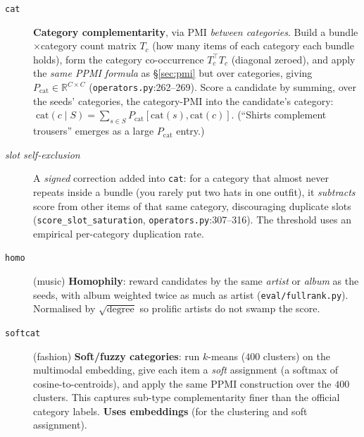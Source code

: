 \documentclass[11pt]{article}
\theoremstyle{remark}
\newcommand{\R}{\mathbb{R}}
\newcommand{\code}[1]{\texttt{\small #1}}
\begin{document}
\begin{description}
\item[\code{cat}] \textbf{Category complementarity}, via PMI \emph{between categories}. Build a bundle$\times$category
count matrix $T_c$ (how many items of each category each bundle holds), form the category co-occurrence
$T_c^{\!\top}T_c$ (diagonal zeroed), and apply the \emph{same PPMI formula} as \S\ref{sec:pmi} but over categories,
giving $P_{\text{cat}}\in\R^{C\times C}$ (\code{operators.py}:262--269). Score a candidate by summing, over the
seeds' categories, the category-PMI into the candidate's category:
$\;\mathrm{cat}(c\mid S)=\sum_{s\in S}P_{\text{cat}}[\mathrm{cat}(s),\mathrm{cat}(c)]$. (``Shirts complement
trousers'' emerges as a large $P_{\text{cat}}$ entry.)
\item[\textit{slot self-exclusion}] A \emph{signed} correction added into \code{cat}: for a category that almost never
repeats inside a bundle (you rarely put two hats in one outfit), it \emph{subtracts} score from other items of that
same category, discouraging duplicate slots (\code{score\_slot\_saturation}, \code{operators.py}:307--316). The
threshold uses an empirical per-category duplication rate.
\item[\code{homo}] (music) \textbf{Homophily}: reward candidates by the same \emph{artist} or \emph{album} as the
seeds, with album weighted twice as much as artist (\code{eval/fullrank.py}). Normalised by
$\sqrt{\text{degree}}$ so prolific artists do not swamp the score.
\item[\code{softcat}] (fashion) \textbf{Soft/fuzzy categories}: run $k$-means ($400$ clusters) on the multimodal
embedding, give each item a \emph{soft} assignment (a softmax of cosine-to-centroids), and apply the same PPMI
construction over the $400$ clusters. This captures sub-type complementarity finer than the official category labels.
\textbf{Uses embeddings} (for the clustering and soft assignment).
\end{description}
\end{document}
